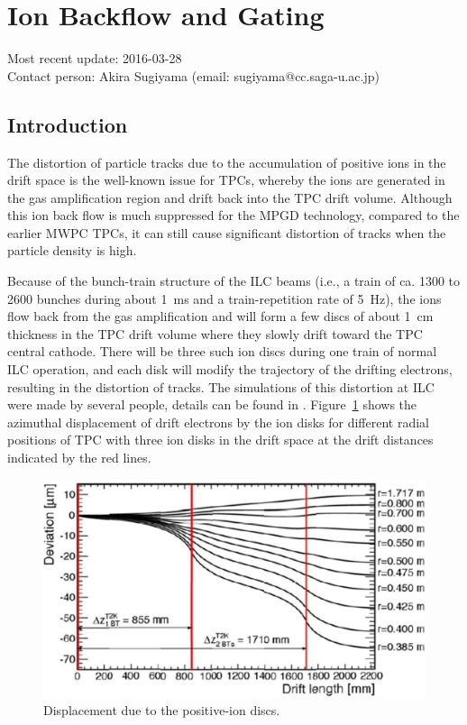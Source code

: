 \section{Ion Backflow and Gating}
\label{chap:TPC_sec:gating}
Most recent update: 2016-03-28 \\
Contact person: Akira Sugiyama (email: sugiyama@cc.saga-u.ac.jp)\\

\subsection{Introduction}

The distortion of particle tracks due to the accumulation of positive ions in the drift space is the well-known
issue for TPCs, whereby the ions are generated in the gas amplification region and drift back into the TPC drift volume.
Although this ion back flow is much suppressed for the MPGD technology, compared to the earlier MWPC TPCs, it can
still cause significant distortion of tracks when the particle density is high.

Because of the bunch-train structure of the ILC beams (i.e., a  train of ca. 1300 to 2600 bunches during
about \SI{1}{ms}
and a train-repetition rate of \SI{5}{Hz}), the ions flow back from the gas amplification and will form a few discs
of about \SI{1}{cm} thickness in the TPC drift volume where they slowly drift toward the TPC central cathode.
There will be three such ion discs during one train of normal ILC operation, and each disk will modify the trajectory
of the drifting electrons, resulting in the distortion of tracks. The simulations of this distortion at ILC
were made by several people, details can be found in \cite{LC-DET-2012-079,Fujii_IonEffects}.
Figure~\ref{Fig1gating} shows the azimuthal displacement of drift electrons by the ion
disks for different radial positions of TPC with three ion disks in the drift space at the drift distances
indicated by the red lines.

\begin{figure}
\begin{center}
\includegraphics[width=.7\textwidth]{Tracker/TPC_Bonn/plots/TPC-Gate_Fig1gating.pdf}%
\caption{\label{Fig1gating} {Displacement due to the positive-ion discs.}}
\end{center}
\end{figure}


